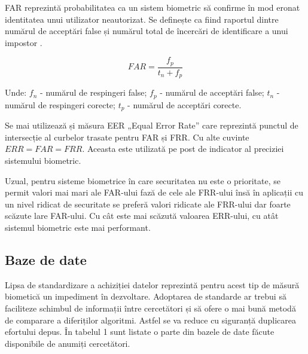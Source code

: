 \documentclass[9pt,shortpaper,twoside,web]{ieeecolor}
\begin{document}
FAR reprezintă probabilitatea ca un sistem biometric să confirme în mod eronat identitatea unui utilizator neautorizat. Se definește ca fiind raportul dintre numărul de acceptări false și numărul total de încercări de identificare a unui impostor \cite{b7}.

\begin{equation} \label{eq2}
FAR = \frac{f_p}{t_n + f_p}
\end{equation}

Unde: $f_n$ - numărul de respingeri false; $f_p$ - numărul de acceptări false; $t_n$ - numărul de respingeri corecte; $t_p$ - numărul de acceptări corecte.

	Se mai utilizează și măsura EER „Equal Error Rate” care reprezintă punctul de intersecție al curbelor trasate pentru FAR și FRR. Cu alte cuvinte $ERR = FAR = FRR$. Aceasta este utilizată pe post de indicator al preciziei sistemului biometric.
	
	Uzual, pentru sisteme biometrice în care securitatea nu este o prioritate, se permit valori mai mari ale FAR-ului fază de cele ale FRR-ului însă în aplicații cu un nivel ridicat de securitate se preferă valori ridicate ale FRR-ului dar foarte scăzute lare FAR-ului. Cu cât este mai scăzută valoarea ERR-ului, cu atât sistemul biometric este mai performant.

\subsection{Baze de date}
	Lipsa de standardizare a achiziției datelor reprezintă pentru acest tip de măsură biometică un impediment în dezvoltare. Adoptarea de standarde ar trebui să faciliteze schimbul de informații între cercetători  și să ofere o mai bună metodă de comparare a diferiților algoritmi. Astfel se va reduce cu siguranță duplicarea efortului depus.
	În tabelul 1 sunt listate o parte din bazele de date făcute disponibile de anumiți cercetători. \\
\end{document}
